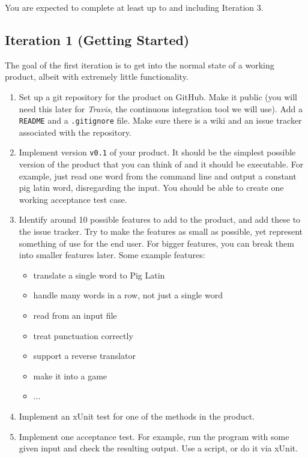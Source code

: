 \documentclass[swedish,english]{article}
\begin{document}
You are expected to complete at least up to and including Iteration 3.

\subsection*{Iteration 1 (Getting Started)}
The goal of the first iteration is to get into the normal state of a working product, albeit with extremely little functionality.

\begin{enumerate}

\item Set up a git repository for the product on GitHub. Make it public (you will need this later for \emph{Travis}, the continuous integration tool we will use). Add a \verb'README' and a \verb'.gitignore' file. Make sure there is a wiki and an issue tracker associated with the repository.

\item Implement version \verb'v0.1' of your product. It should be the simplest possible version of the product that you can think of and it should be executable. For example, just read one word from the command line and output a constant pig latin word, disregarding the input. You should be able to create one working acceptance test case.

\item Identify around 10 possible features to add to the product, and add these to the issue tracker. Try to make the features as small as possible, yet represent something of use for the end user. For bigger features, you can break them into smaller features later. Some example features:
\begin{itemize}
\item translate a single word to Pig Latin
\item handle many words in a row, not just a single word
\item read from an input file
\item treat punctuation correctly
\item support a reverse translator
\item make it into a game
\item ...
\end{itemize}

\item Implement an xUnit test for one of the methods in the  product.

\item Implement one acceptance test. For example, run the program with some given input and check the resulting output. Use a script, or do it via xUnit.


\end{enumerate}
\end{document}
